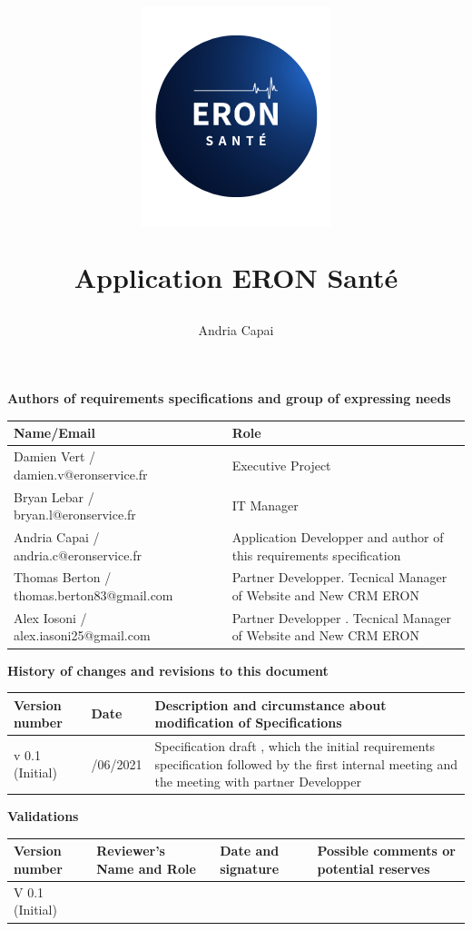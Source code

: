 \documentclass[
  12pt,
]{article}
\title{\includegraphics{logo.png}

Application ERON Santé}
\author{Andria Capai}
\date{}
\begin{document}
\maketitle

{
\setcounter{tocdepth}{3}
\tableofcontents
}
\newpage

\textbf{Authors of requirements specifications and group of expressing
needs}

\begin{longtable}[]{@{}
  >{\raggedright\arraybackslash}p{}
  >{\raggedright\arraybackslash}p{}@{}}
\toprule
Name/Email & Role \\
\midrule
\endhead
Damien Vert / damien.v@eronservice.fr & Executive Project \\
Bryan Lebar / bryan.l@eronservice.fr & IT Manager \\
Andria Capai / andria.c@eronservice.fr & Application Developper and
author of this requirements specification \\
Thomas Berton / thomas.berton83@gmail.com & Partner Developper. Tecnical
Manager of Website and New CRM ERON \\
Alex Iosoni / alex.iasoni25@gmail.com & Partner Developper . Tecnical
Manager of Website and New CRM ERON \\
\bottomrule
\end{longtable}

\textbf{History of changes and revisions to this document}

\begin{longtable}[]{@{}
  >{\raggedright\arraybackslash}p{}
  >{\raggedright\arraybackslash}p{}
  >{\raggedright\arraybackslash}p{}@{}}
\toprule
Version number & Date & Description and circumstance about modification
of Specifications \\
\midrule
\endhead
v 0.1 (Initial) & 07/06/2021 & Specification draft , which the initial
requirements specification followed by the first internal meeting and
the meeting with partner Developper \\
\bottomrule
\end{longtable}

\textbf{Validations}

\begin{longtable}[]{@{}
  >{\raggedright\arraybackslash}p{}
  >{\raggedright\arraybackslash}p{}
  >{\raggedright\arraybackslash}p{}
  >{\raggedright\arraybackslash}p{}@{}}
\toprule
Version number & Reviewer's Name and Role & Date and signature &
Possible comments or potential reserves \\
\midrule
\endhead
V 0.1 (Initial) & & & \\
\bottomrule
\end{longtable}
\end{document}
